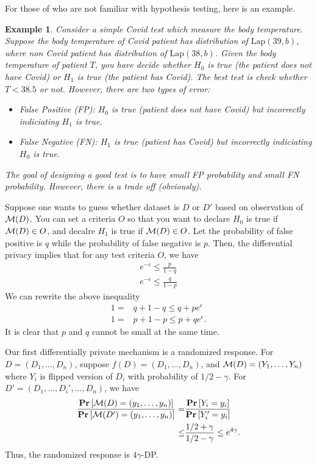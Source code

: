 \documentclass[11pt, a4paper]{article}
\newtheorem{example}{Example}
\begin{document}
For those of who are not familiar with hypothesis testing, here is an example.
\begin{example}
    Consider a simple Covid test which measure the body temperature.
    Suppose the body temperature of Covid patient has distribution of $\mbox{Lap}(39, b)$,
    where non Covid patient has distribution of $\mbox{Lap}(38, b)$.
    Given the body temperature of patient $T$, you have decide whether $H_0$ is true (the patient does not have Covid) or $H_1$ is true (the patient has Covid).
    The best test is check whether $T<38.5$ or not.
    However, there are two types of error:
    \begin{itemize}
        \item False Positive (FP): $H_0$ is true (patient does not have Covid) but incorrectly indiciating $H_1$ is true.
        \item False Negative (FN): $H_1$ is true (patient has Covid) but incorrectly indiciating $H_0$ is true.
    \end{itemize}
    The goal of designing a good test is to have small FP probability and small FN probability.
    However, there is a trade off (obviously).
\end{example}
Suppose one wants to guess whether dataset is $D$ or $D'$ based on observation of ${\cal M}(D)$.
You can set a criteria $O$ so that you want to declare $H_0$ is true if ${\cal M}(D) \in O$, 
and decalre $H_1$ is true if ${\cal M}(D) \in O$.
Let the probability of false positive is $q$ while the probability of false negative is $p$.
Then, the differential privacy implies that for any test criteria $O$, we have
\begin{align}
    e^{-\epsilon} \leq \frac{p}{1-q}\\
    e^{-\epsilon} \leq \frac{q}{1-p}
\end{align}
We can rewrite the above inequality
\begin{align}
    1 =& q + 1-q \leq q+ pe^\epsilon\\
    1 =& p + 1-p \leq p+ qe^\epsilon.
\end{align}
It is clear that $p$ and $q$ cannot be small at the same time.

Our first differentially private mechanism is a randomized response.
For $D=(D_1, \dots, D_n)$, suppose $f(D) = (D_1, \dots, D_n)$, and ${\cal M}(D) = (Y_1, \dots, Y_n)$ where $Y_i$ is flipped version of $D_i$ with probability of $1/2-\gamma$.
For $D' = (D_1, \dots, D_i', \dots, D_n)$, we have
\begin{align}
    \frac{\Prob{\cM(D) = (y_1, \dots, y_n)}}{\Prob{\cM(D') = (y_1, \dots, y_n)}}
    =& \frac{\Prob{Y_i = y_i}}{\Prob{Y_i' = y_i}}\\
    \leq& \frac{1/2+\gamma}{1/2-\gamma} \leq e^{4\gamma}.
\end{align}
Thus, the randomized response is $4\gamma$-DP.
\end{document}
